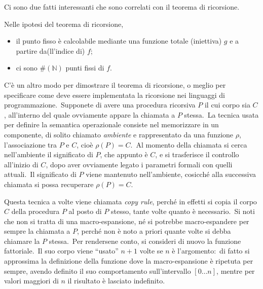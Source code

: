 \noindent Ci sono due fatti interessanti che sono correlati con il teorema di ricorsione.\
\begin{property}
    Nelle ipotesi del teorema di ricorsione,
    \begin{itemize}
        \item il punto fisso è calcolabile mediante una funzione totale (iniettiva) $g$ e a partire da(ll'indice di) $f$;
        \item ci sono $\#(\mathbb{N})$ punti fissi di $f$.
    \end{itemize}
\end{property}

\noindent C'è un altro modo per dimostrare il teorema di ricorsione, o meglio per specificare come deve essere implementata la ricorsione nei linguaggi di programmazione.\
Supponete di avere una procedura ricorsiva $P$ il cui corpo sia $C$, all'interno del quale ovviamente appare la chiamata a $P$ stessa.\
La tecnica usata per definire la semantica operazionale consiste nel memorizzare in un componente, di solito chiamato \textit{ambiente} e rappresentato da una funzione $\rho$, l'associazione tra $P$ e $C$, cioè $\rho(P) = C$.\
Al momento della chiamata si cerca nell'ambiente il significato di $P$, che appunto è $C$, e si trasferisce il controllo all'inizio di $C$, dopo aver ovviamente legato i parametri formali con quelli attuali.\
Il significato di $P$ viene mantenuto nell'ambiente, cosicché alla successiva chiamata si possa recuperare $\rho(P) = C$.\

Questa tecnica a volte viene chiamata \textit{copy rule}, perché in effetti si copia il corpo $C$ della procedura $P$ al posto di $P$ stesso, tante volte quanto è necessario.\
Si noti che non si tratta di una macro-espansione, né si potrebbe macro-espandere per sempre la chiamata a $P$, perché non è noto a priori quante volte si debba chiamare la $P$ stessa.\
Per rendersene conto, si consideri di nuovo la funzione fattoriale.\
Il suo corpo viene ``usato'' $n + 1$ volte se $n$ è l'argomento:\ di fatto si approssima la definizione della funzione dove la macro-espansione è ripetuta per sempre, avendo definito il suo comportamento sull'intervallo $[0\dots n]$, mentre per valori maggiori di $n$ il risultato è lasciato indefinito.
